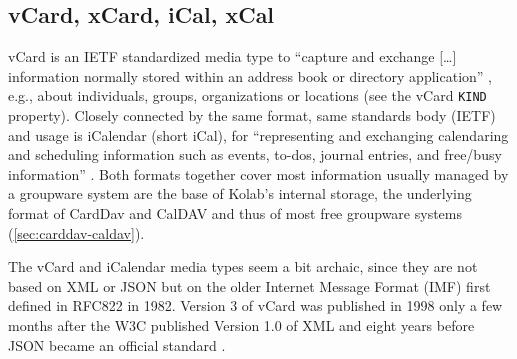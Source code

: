 \documentclass[11pt,a4paper,headsepline,twoside]{scrartcl}		%
\begin{document}


\subsection{vCard, xCard, iCal, xCal}
\label{sec:vcard-xcard-ical}

vCard is an IETF standardized media type to ``capture and exchange [\ldots]
information normally stored within an address book or directory application''
\cite{RFC6350}, e.g., about individuals, groups, organizations or locations (see
the vCard \lstinline:KIND: property). Closely connected by the same format, same
standards body (IETF) and usage is iCalendar (short iCal), for ``representing
and exchanging calendaring and scheduling information such as events, to-dos,
journal entries, and free/busy information'' \cite{RFC5545}. Both formats
together cover most information usually managed by a groupware system are the
base of Kolab's internal storage, the underlying format of CardDav and CalDAV
and thus of most free groupware systems (\autoref{sec:carddav-caldav}).

The vCard and iCalendar media types seem a bit archaic, since they are not based
on XML or JSON but on the older Internet Message Format \cite{RFC5322} (IMF)
first defined in RFC822 in 1982. Version 3 of vCard was published in 1998
\cite{RFC2425} only a few months after the W3C published Version 1.0 of XML
\cite{Paoli:98:XR} and eight years before JSON became an official standard
\cite{RFC4627}.
\end{document}
